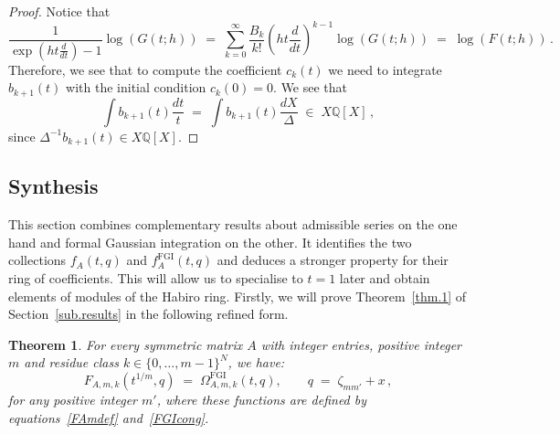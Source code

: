 \documentclass[12pt,reqno]{amsart}
\newcounter{theoremcount}
\newtheorem{theorem}[theoremcount]{Theorem}
\theoremstyle{definition}
\def\BQ{\mathbb Q}
\def\be{\begin{equation}}
\def\ee{\end{equation}}
\def\z{\zeta}
\def\={\;=\;}
\def\inn{\;\in\;}
\def\FGI{\mathrm{FGI}}
\def\CS{\Omega^{\FGI}}
\def\Phitof{f}
\begin{document}
\begin{proof}
Notice that
\be
\frac{1}{\exp(h t\frac{d}{dt})-1}\log(G(t;h))
\= \sum_{k=0}^{\infty}\frac{B_k}{k!}(h t\frac{d}{dt})^{k-1}\log(G(t;h))
\= \log(F(t;h))\,.
\ee
Therefore, we see that to compute the coefficient $c_{k}(t)$ we need to integrate
$b_{k+1}(t)$ with the initial condition $c_{k}(0)=0$. We see that
\be
\int b_{k+1}(t)\frac{dt}{t} \= \int b_{k+1}(t)\frac{dX}{\Delta} \inn X\BQ[X]\,,
\ee
since $\Delta^{-1}b_{k+1}(t)\in X\BQ[X]$.
\end{proof}

\subsection{Synthesis}
\label{sub.synthesis}

This section combines complementary results about admissible series on the one
hand and formal Gaussian integration on the other. It identifies the two
collections $\Phitof_A(t,q)$ and $\Phitof_A^\FGI(t,q)$ and deduces a stronger
property for their ring of coefficients.
This will allow us to specialise to $t=1$ later and obtain elements of
modules of the Habiro ring. Firstly, we will prove Theorem~\ref{thm.1} of
Section~\ref{sub.results} in the following refined form. 

\begin{theorem}
\label{thm.fgi.is.admis}
For every symmetric matrix $A$ with integer entries, positive integer $m$ and residue
class $k\in\{0,\dots,m-1\}^{N}$, we have:
\be
\label{eq.thm1.again}
F_{A,m,k}(t^{1/m},q) \= \CS_{A,m,k}(t,q), \qquad q\=\z_{mm'}+x\,,
\ee
for any positive integer $m'$, where these functions are defined by
equations~\eqref{FAmdef} and~\eqref{FGIcong}.
\end{theorem} 
\end{document}
